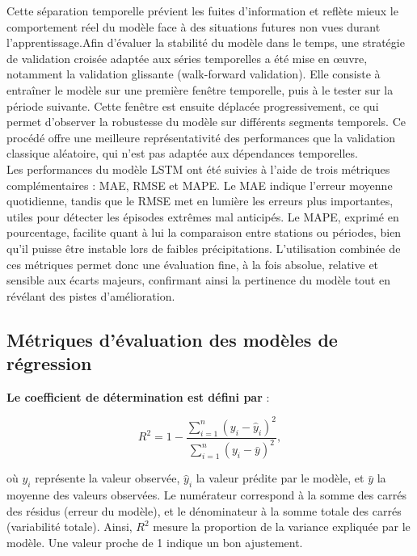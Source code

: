 \documentclass[a4paper,12pt,openany]{report}
\begin{document}
	 Cette séparation temporelle prévient les fuites d’information et reflète mieux le comportement réel du modèle face à des situations futures non vues durant l’apprentissage.Afin d’évaluer la stabilité du modèle dans le temps, une stratégie de validation croisée adaptée aux séries temporelles a été mise en œuvre, notamment la validation glissante (walk-forward validation). Elle consiste à entraîner le modèle sur une première fenêtre temporelle, puis à le tester sur la période suivante. Cette fenêtre est ensuite déplacée progressivement, ce qui permet d’observer la robustesse du modèle sur différents segments temporels. Ce procédé offre une meilleure représentativité des performances que la validation classique aléatoire, qui n’est pas adaptée aux dépendances temporelles.\\
	Les performances du modèle LSTM ont été suivies à l’aide de trois métriques complémentaires : MAE, RMSE et MAPE. Le MAE indique l’erreur moyenne quotidienne, tandis que le RMSE met en lumière les erreurs plus importantes, utiles pour détecter les épisodes extrêmes mal anticipés. Le MAPE, exprimé en pourcentage, facilite quant à lui la comparaison entre stations ou périodes, bien qu’il puisse être instable lors de faibles précipitations. L’utilisation combinée de ces métriques permet donc une évaluation fine, à la fois absolue, relative et sensible aux écarts majeurs, confirmant ainsi la pertinence du modèle tout en révélant des pistes d’amélioration.\\
	
	\subsection{Métriques d'évaluation des modèles de régression}
	
	\textbf{Le coefficient de détermination est défini par }:
	
	\begin{equation}
		R^2 = 1 - \frac{\sum_{i=1}^{n} (y_i - \hat{y}_i)^2}{\sum_{i=1}^{n} (y_i - \bar{y})^2}  ,
	\end{equation}
	
	où $y_i$ représente la valeur observée, $\hat{y}_i$ la valeur prédite par le modèle, et $\bar{y}$ la moyenne des valeurs observées. Le numérateur correspond à la somme des carrés des résidus (erreur du modèle), et le dénominateur à la somme totale des carrés (variabilité totale). Ainsi, $R^2$ mesure la proportion de la variance expliquée par le modèle. Une valeur proche de 1 indique un bon ajustement.
	
\end{document}
